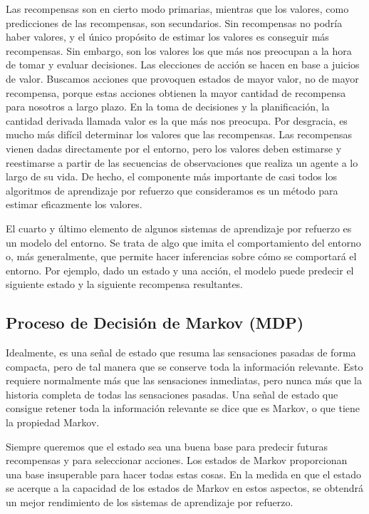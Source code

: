 Las recompensas son en cierto modo primarias, mientras que los valores, como predicciones de las recompensas, son secundarios. Sin recompensas no podría haber valores, y el único propósito de estimar los valores es conseguir más recompensas. Sin embargo, son los valores los que más nos preocupan a la hora de tomar y evaluar decisiones. Las elecciones de acción se hacen en base a juicios de valor. Buscamos acciones que provoquen estados de mayor valor, no de mayor recompensa, porque estas acciones obtienen la mayor cantidad de recompensa para nosotros a largo plazo. En la toma de decisiones y la planificación, la cantidad derivada llamada valor es la que más nos preocupa. Por desgracia, es mucho más difícil determinar los valores que las recompensas. Las recompensas vienen dadas directamente por el entorno, pero los valores deben estimarse y reestimarse a partir de las secuencias de observaciones que realiza un agente a lo largo de su vida. De hecho, el componente más importante de casi todos los algoritmos de aprendizaje por refuerzo que consideramos es un método para estimar eficazmente los valores.

El cuarto y último elemento de algunos sistemas de aprendizaje por refuerzo es un modelo del entorno. Se trata de algo que imita el comportamiento del entorno o, más generalmente, que permite hacer inferencias sobre cómo se comportará el entorno. Por ejemplo, dado un estado y una acción, el modelo puede predecir el siguiente estado y la siguiente recompensa resultantes.


\subsection{Proceso de Decisión de Markov (MDP)}

Idealmente, es una señal de estado que resuma las sensaciones pasadas de forma compacta, pero de tal manera que se conserve toda la información relevante. Esto requiere normalmente más que las sensaciones inmediatas, pero nunca más que la historia completa de todas las sensaciones pasadas. Una señal de estado que consigue retener toda la información relevante se dice que es Markov, o que tiene la propiedad Markov.

Siempre queremos que el estado sea una buena base para predecir futuras recompensas y para seleccionar acciones. Los estados de Markov proporcionan una base insuperable para hacer todas estas cosas. En la medida en que el estado se acerque a la capacidad de los estados de Markov en estos aspectos, se obtendrá un mejor rendimiento de los sistemas de aprendizaje por refuerzo.

